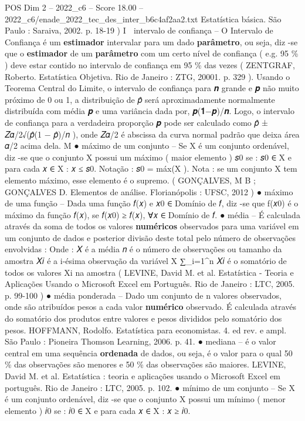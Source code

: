 \begin{textsample}{POS Dim 2 – 2022\_c6 – Score 18.00 – 2022\_c6/enade\_2022\_tec\_des\_inter\_b6c4af2aa2.txt}
Estatística básica.
São Paulo : Saraiva, 2002. p. 18-19 ) I  intervalo de confiança – O Intervalo de Confiança é um \textbf{estimador} intervalar para um dado \textbf{parâmetro}, ou seja, diz -se que o \textbf{estimador} de um \textbf{parâmetro} com um certo nível de confiança ( e.g. 95 \% ) deve estar contido no intervalo de confiança em 95 \% das vezes ( ZENTGRAF, Roberto.
Estatística Objetiva.
Rio de Janeiro : ZTG, 20001. p. 329 ).
Usando o Teorema Central do Limite, o intervalo de confiança para 𝒏 grande e 𝒑 não muito próximo de 0 ou 1, a distribuição de 𝑝̂ será aproximadamente normalmente distribuída com média 𝒑 e uma variância dada por, 𝒑(𝟏−𝒑)/𝒏.
Logo, o intervalo de confiança para a verdadeira proporção 𝒑 pode ser calculado como 𝑝̂ ± 𝑍𝛼/2√(𝑝̂(1 − 𝑝̂)/𝑛 ), onde 𝑍𝛼/2 é abscissa da curva normal padrão que deixa área 𝛼/2 acima dela.
M {\EmojiFont ●} máximo de um conjunto – Se X é um conjunto ordenável, diz -se que o conjunto X possui um máximo ( maior elemento ) 𝑠0 se : 𝑠0 ∈ X e para cada 𝑥 ∈ X : 𝑥 ≤ 𝑠0.
Notação : 𝑠0 = máx(X ).
Nota : se um conjunto X tem elemento máximo, esse elemento é o supremo. ( GONÇALVES, M B ; GONÇALVES D.
Elementos de análise.
Florianópolis : UFSC, 2012 ) {\EmojiFont ●} máximo de uma função – Dada uma função 𝑓(𝑥) e 𝑥0 ∈ Domínio de 𝑓, diz -se que f(𝑥0) é o máximo da função 𝑓(𝑥), se 𝑓(𝑥0) ≥ 𝑓(𝑥), ∀𝑥 ∈ Domínio de 𝑓. {\EmojiFont ●} média – É calculada através da soma de todos os valores \textbf{numéricos} observados para uma variável em um conjunto de dados e posterior divisão deste total pelo número de observações envolvidas : Onde : 𝑋 é a média 𝑛 é o número de observações ou tamanho da amostra 𝑋𝑖 é a i-ésima observação da variável X ∑\_i=1\textasciicircum{}n 𝑋𝑖 é o somatório de todos os valores Xi na amostra ( LEVINE, David M. et al.
Estatística - Teoria e Aplicações Usando o Microsoft Excel em Português.
Rio de Janeiro : LTC, 2005. p. 99-100 ) {\EmojiFont ●} média ponderada – Dado um conjunto de n valores observados, onde são atribuídos pesos a cada valor \textbf{numérico} observado.
É calculada através do somatório dos produtos entre valores e pesos divididos pelo somatório dos pesos.
HOFFMANN, Rodolfo.
Estatística para economistas. 4. ed rev. e ampl.
São Paulo : Pioneira Thomson Learning, 2006. p. 41. {\EmojiFont ●} mediana – é o valor central em uma sequência \textbf{ordenada} de dados, ou seja, é o valor para o qual 50 \% das observações são menores e 50 \% das observações são maiores.
LEVINE, David M. et al.
Estatística : teoria e aplicações usando o Microsoft Excel em português.
Rio de Janeiro : LTC, 2005. p. 102. {\EmojiFont ●} mínimo de um conjunto – Se X é um conjunto ordenável, diz -se que o conjunto X possui um mínimo ( menor elemento ) 𝑖0 se : 𝑖0 ∈ X e para cada 𝑥 ∈ X : 𝑥 ≥ 𝑖0.

\end{textsample}
